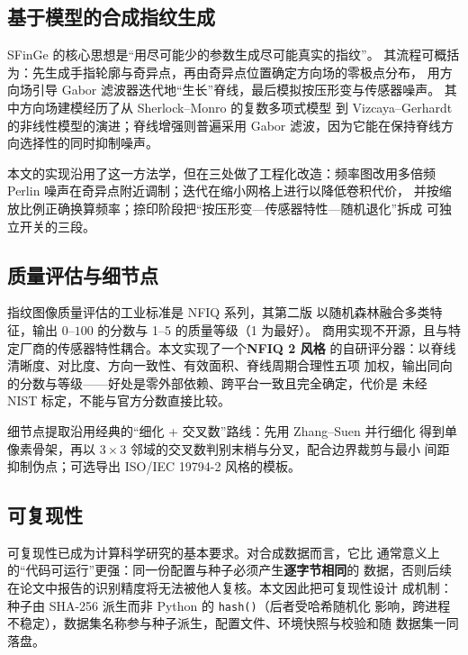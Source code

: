 \documentclass[UTF8, fontset=windows, a4paper, 11pt]{ctexart}
\begin{document}
\subsection{基于模型的合成指纹生成}

SFinGe 的核心思想是``用尽可能少的参数生成尽可能真实的指纹''\cite{cappelli2000}。
其流程可概括为：先生成手指轮廓与奇异点，再由奇异点位置确定方向场的零极点分布，
用方向场引导 Gabor 滤波器迭代地``生长''脊线，最后模拟按压形变与传感器噪声。
其中方向场建模经历了从 Sherlock--Monro 的复数多项式模型\cite{sherlock1994}
到 Vizcaya--Gerhardt 的非线性模型\cite{vizcaya1996}的演进；脊线增强则普遍采用
Gabor 滤波\cite{hong1998}，因为它能在保持脊线方向选择性的同时抑制噪声。

本文的实现沿用了这一方法学，但在三处做了工程化改造：频率图改用多倍频 Perlin
噪声\cite{perlin1985}在奇异点附近调制；迭代在缩小网格上进行以降低卷积代价，
并按缩放比例正确换算频率；捺印阶段把``按压形变—传感器特性—随机退化''拆成
可独立开关的三段。

\subsection{质量评估与细节点}

指纹图像质量评估的工业标准是 NFIQ 系列\cite{tabassi2004,tabassi2021}，其第二版
以随机森林融合多类特征，输出 $0$--$100$ 的分数与 1--5 的质量等级（1 为最好）。
商用实现不开源，且与特定厂商的传感器特性耦合。本文实现了一个\textbf{NFIQ 2 风格}
的自研评分器：以脊线清晰度、对比度、方向一致性、有效面积、脊线周期合理性五项
加权，输出同向的分数与等级——好处是零外部依赖、跨平台一致且完全确定，代价是
未经 NIST 标定，不能与官方分数直接比较。

细节点提取沿用经典的``细化 + 交叉数''路线：先用 Zhang--Suen 并行细化\cite{zhang1984}
得到单像素骨架，再以 $3\times3$ 邻域的交叉数判别末梢与分叉，配合边界裁剪与最小
间距抑制伪点；可选导出 ISO/IEC 19794-2 风格的模板\cite{iso19794}。

\subsection{可复现性}

可复现性已成为计算科学研究的基本要求\cite{sandve2013}。对合成数据而言，它比
通常意义上的``代码可运行''更强：同一份配置与种子必须产生\textbf{逐字节相同}的
数据，否则后续在论文中报告的识别精度将无法被他人复核。本文因此把可复现性设计
成机制：种子由 SHA-256 派生而非 Python 的 \texttt{hash()}（后者受哈希随机化
影响，跨进程不稳定），数据集名称参与种子派生，配置文件、环境快照与校验和随
数据集一同落盘。
\end{document}
